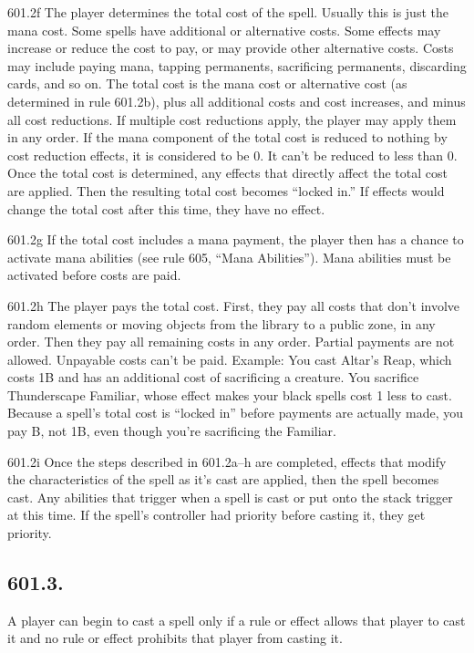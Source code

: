 601.2f The player determines the total cost of the spell. Usually this is just the mana cost. Some spells have additional or alternative costs. Some effects may increase or reduce the cost to pay, or may provide other alternative costs. Costs may include paying mana, tapping permanents, sacrificing permanents, discarding cards, and so on. The total cost is the mana cost or alternative cost (as determined in rule 601.2b), plus all additional costs and cost increases, and minus all cost reductions. If multiple cost reductions apply, the player may apply them in any order. If the mana component of the total cost is reduced to nothing by cost reduction effects, it is considered to be {0}. It can’t be reduced to less than {0}. Once the total cost is determined, any effects that directly affect the total cost are applied. Then the resulting total cost becomes “locked in.” If effects would change the total cost after this time, they have no effect.

601.2g If the total cost includes a mana payment, the player then has a chance to activate mana abilities (see rule 605, “Mana Abilities”). Mana abilities must be activated before costs are paid.

601.2h The player pays the total cost. First, they pay all costs that don’t involve random elements or moving objects from the library to a public zone, in any order. Then they pay all remaining costs in any order. Partial payments are not allowed. Unpayable costs can’t be paid.
Example: You cast Altar’s Reap, which costs {1}{B} and has an additional cost of sacrificing a creature. You sacrifice Thunderscape Familiar, whose effect makes your black spells cost {1} less to cast. Because a spell’s total cost is “locked in” before payments are actually made, you pay {B}, not {1}{B}, even though you’re sacrificing the Familiar.

601.2i Once the steps described in 601.2a–h are completed, effects that modify the characteristics of the spell as it’s cast are applied, then the spell becomes cast. Any abilities that trigger when a spell is cast or put onto the stack trigger at this time. If the spell’s controller had priority before casting it, they get priority.

\subsection*{601.3.}
A player can begin to cast a spell only if a rule or effect allows that player to cast it and no rule or effect prohibits that player from casting it.

